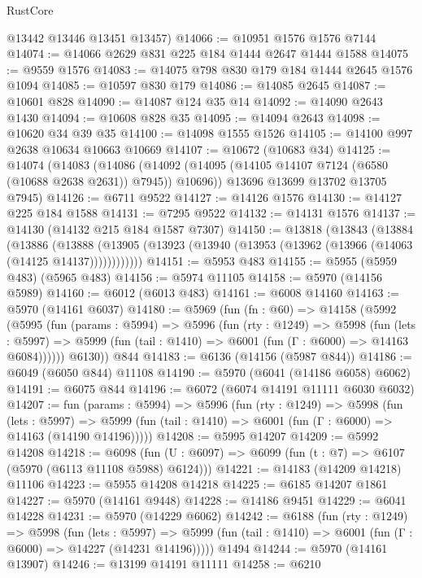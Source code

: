 \begin{lexlean}{RustCore}
\begin{coremodule}
      @13442
      @13446
      @13451
      @13457)
@14066 := @10951 @1576 @1576 @7144
@14074 := @14066 @2629 @831 @225 @184 @1444 @2647 @1444 @1588
@14075 := @9559 @1576
@14083 := @14075 @798 @830 @179 @184 @1444 @2645 @1576 @1094
@14085 := @10597 @830 @179
@14086 := @14085 @2645
@14087 := @10601 @828
@14090 := @14087 @124 @35 @14
@14092 := @14090 @2643 @1430
@14094 := @10608 @828 @35
@14095 := @14094 @2643
@14098 := @10620 @34 @39 @35
@14100 := @14098 @1555 @1526
@14105 := @14100 @997 @2638 @10634 @10663 @10669
@14107 := @10672 (@10683 @34)
@14125 := @14074
    (@14083
      (@14086 (@14092 (@14095 (@14105 @14107 @7124 (@6580 (@10688 @2638 @2631)) @7945)) @10696))
      @13696
      @13699
      @13702
      @13705
      @7945)
@14126 := @6711 @9522
@14127 := @14126 @1576
@14130 := @14127 @225 @184 @1588
@14131 := @7295 @9522
@14132 := @14131 @1576
@14137 := @14130 (@14132 @215 @184 @1587 @7307)
@14150 := @13818
    (@13843
      (@13884
        (@13886
          (@13888 (@13905 (@13923 (@13940 (@13953 (@13962 (@13966 (@14063 (@14125 @14137))))))))))))
@14151 := @5953 @483
@14155 := @5955 (@5959 @483) (@5965 @483)
@14156 := @5974 @11105
@14158 := @5970 (@14156 @5989)
@14160 := @6012 (@6013 @483)
@14161 := @6008 @14160
@14163 := @5970 (@14161 @6037)
@14180 := @5969
    (fun (fn : @60) =>
    @14158
      (@5992
        (@5995
          (fun (params : @5994) =>
          @5996
            (fun (rty : @1249) =>
            @5998
              (fun (lets : @5997) =>
              @5999 (fun (tail : @1410) => @6001 (fun (Γ : @6000) => @14163 @6084))))))
        @6130))
    @844
@14183 := @6136 (@14156 (@5987 @844))
@14186 := @6049 (@6050 @844) @11108
@14190 := @5970 (@6041 (@14186 @6058) @6062)
@14191 := @6075 @844
@14196 := @6072 (@6074 @14191 @11111 @6030 @6032)
@14207 := fun (params : @5994) =>
  @5996
    (fun (rty : @1249) =>
    @5998
      (fun (lets : @5997) =>
      @5999 (fun (tail : @1410) => @6001 (fun (Γ : @6000) => @14163 (@14190 @14196)))))
@14208 := @5995 @14207
@14209 := @5992 @14208
@14218 := @6098
    (fun (U : @6097) => @6099 (fun (t : @7) => @6107 (@5970 (@6113 @11108 @5988) @6124)))
@14221 := @14183 (@14209 @14218) @11106
@14223 := @5955 @14208 @14218
@14225 := @6185 @14207 @1861
@14227 := @5970 (@14161 @9448)
@14228 := @14186 @9451
@14229 := @6041 @14228
@14231 := @5970 (@14229 @6062)
@14242 := @6188
    (fun (rty : @1249) =>
    @5998
      (fun (lets : @5997) =>
      @5999 (fun (tail : @1410) => @6001 (fun (Γ : @6000) => @14227 (@14231 @14196)))))
    @1494
@14244 := @5970 (@14161 @13907)
@14246 := @13199 @14191 @11111
@14258 := @6210

\end{coremodule}
\end{lexlean}
